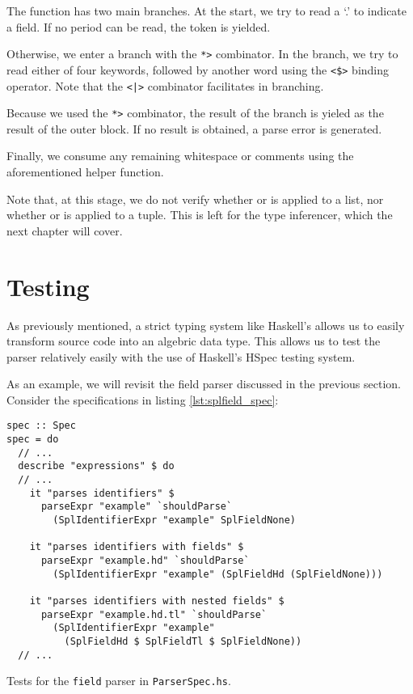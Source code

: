 The  function has two main branches.
At the start, we try to read a `.' to indicate a field.
If no period can be read, the  token is yielded.

Otherwise, we enter a branch with the \texttt{*>} combinator.
In the branch, we try to read either of four keywords, followed by another word using the \texttt{<\$>} binding operator.
Note that the \texttt{<|>} combinator facilitates in branching.

Because we used the \texttt{*>} combinator, the result of the branch is yieled as the result of the outer block. If no result is obtained, a parse error is generated.

Finally, we consume any remaining whitespace or comments using the aforementioned  helper function.

Note that, at this stage, we do not verify whether  or  is applied to a list, nor whether  or  is applied to a tuple.
This is left for the type inferencer, which the next chapter will cover.

\section{Testing}

As previously mentioned, a strict typing system like Haskell's allows us to easily transform source code into an algebric data type.
This allows us to test the parser relatively easily with the use of Haskell's HSpec testing system.

As an example, we will revisit the field parser discussed in the previous section. Consider the specifications in listing \ref{lst:splfield_spec}:

\begin{listing}
\begin{framed}
\begin{verbatim}
spec :: Spec
spec = do
  // ...
  describe "expressions" $ do
  // ...
    it "parses identifiers" $
      parseExpr "example" `shouldParse`
        (SplIdentifierExpr "example" SplFieldNone)

    it "parses identifiers with fields" $
      parseExpr "example.hd" `shouldParse`
        (SplIdentifierExpr "example" (SplFieldHd (SplFieldNone)))

    it "parses identifiers with nested fields" $
      parseExpr "example.hd.tl" `shouldParse`
        (SplIdentifierExpr "example"
          (SplFieldHd $ SplFieldTl $ SplFieldNone))
  // ...
\end{verbatim}
\end{framed}
\caption{Tests for the \texttt{field} parser in \texttt{ParserSpec.hs}.}
\label{lst:splfield_spec}
\end{listing}

